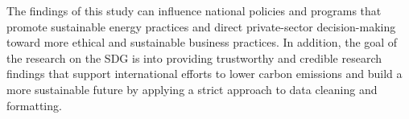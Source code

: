 \documentclass[reprint, onecolumn, amsmath, amssymb, showpacs, superscriptaddress, aps, prl]{revtex4-2}
\begin{document}
The findings of this study can influence national policies and programs that promote sustainable energy practices and direct private-sector decision-making toward more ethical and sustainable business practices. In addition, the goal of the research on the SDG is into providing trustworthy and credible research findings that support international efforts to lower carbon emissions and build a more sustainable future by applying a strict approach to data cleaning and formatting.

\end{document}
